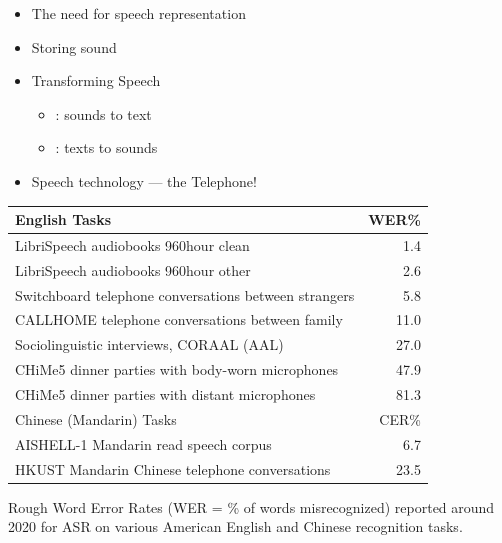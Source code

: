 \documentclass[a4paper,landscape,headrule,footrule,xetex]{foils}
\begin{document}


\maketitle






\begin{itemize}
\item The need for speech representation
\item Storing sound
\item Transforming Speech
  \begin{itemize}
  \item {}: sounds to text
  \item {}: texts to sounds
  \end{itemize}
\item Speech technology --- the Telephone!
\end{itemize}



\begin{tabular}{lr}
  English Tasks &  WER\% \\
  \hline
LibriSpeech audiobooks 960hour clean  & 1.4 \\
LibriSpeech audiobooks 960hour other  & 2.6 \\
Switchboard telephone conversations between strangers & 5.8 \\
CALLHOME telephone conversations between family & 11.0 \\
Sociolinguistic interviews, CORAAL (AAL) & 27.0 \\
CHiMe5 dinner parties with body-worn microphones & 47.9 \\
CHiMe5 dinner parties with distant microphones & 81.3 \\[2ex]
Chinese (Mandarin) Tasks &   CER\% \\ \hline
AISHELL-1 Mandarin read speech corpus & 6.7 \\
HKUST Mandarin Chinese telephone conversations &  23.5 \\
\end{tabular}

Rough Word Error Rates (WER = \% of words misrecognized) reported
around 2020 for ASR on various American English and Chinese
recognition tasks.
\end{document}
